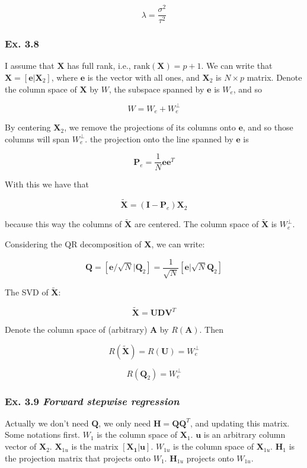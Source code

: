 \documentclass{article}
\begin{document}
\[
\lambda = \frac{\sigma^2}{\tau^2}
\]


\subsubsection{Ex. 3.8}

I assume that $\bm{X}$ has full rank, i.e., $\text{rank}(\bm{X}) = p+1$. We can write that $\bm{X} = [\bm{e} | \bm{X}_2]$, where $\bm{e}$ is the vector with all ones, and $\bm{X}_2$ is $N\times p$ matrix. Denote the column space of $\bm{X}$ by $W$, the subspace spanned by $\bm{e}$ is $W_e$, and so

\[
W = W_e + W_e^{\perp}
\]

By centering $\bm{X}_2$, we remove the projections of its columns onto $\bm{e}$, and so those columns will span $W_e^{\perp}$. the projection onto the line spanned by $\bm{e}$ is

\[
\bm{P}_e = \frac1N \bm{e}\bm{e}^T
\]

With this we have that

\[
\tilde{\bm{X}} = (\bm{I} - \bm{P}_e) \bm{X}_2
\]

because this way the columns of $\tilde{\bm{X}}$ are centered. The column space of $\tilde{\bm{X}}$ is $W_e^{\perp}$.

Considering the QR decomposition of $\bm{X}$, we can write:

\[
\bm{Q} = [\bm{e}/\sqrt{N} | \bm{Q}_2] = \frac{1}{\sqrt{N}} [\bm{e} | \sqrt{N} \bm{Q}_2]
\]

The SVD of $\tilde{\bm{X}}$:

\[
\tilde{\bm{X}} = \bm{U} \bm{D} \bm{V}^{T}
\]

Denote the column space of (arbitrary) $\bm{A}$ by $R(\bm{A})$. Then

\[
R(\tilde{\bm{X}}) = R(\bm{U}) = W_e^{\perp}
\]

\[
R(\bm{Q}_2) = W_e^{\perp}
\]


\subsubsection{Ex. 3.9 \emph{Forward stepwise regression}}

Actually we don't need $\mathbf{Q}$, we only need $\mathbf{H}= \mathbf{Q}\mathbf{Q}^T$, and updating this matrix. Some notations first. $W_1$ is the column space of $\mathbf{X}_1$. $\mathbf{u}$ is an arbitrary column vector of $\mathbf{X}_2$. $\mathbf{X}_{1u}$ is the matrix $[\mathbf{X_1} | \mathbf{u}]$. $W_{1u}$ is the column space of $\mathbf{X}_{1u}$. $\mathbf{H}_1$ is the projection matrix that projects onto $W_1$. $\mathbf{H}_{1u}$ projects onto $W_{1u}$.
\end{document}
